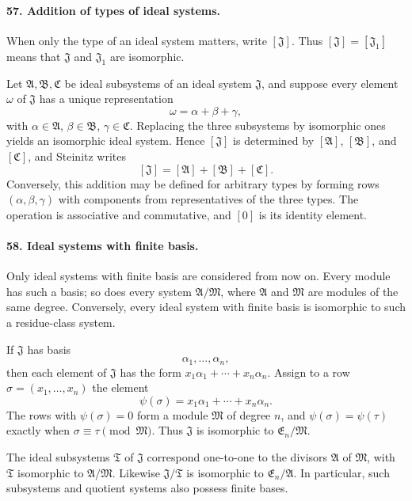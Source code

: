 \documentclass[11pt]{article}
\begin{document}
\paragraph{57. Addition of types of ideal systems.}
When only the type of an ideal system matters, write $[\mathfrak J]$. Thus $[\mathfrak J]=[\mathfrak J_1]$ means that $\mathfrak J$ and $\mathfrak J_1$ are isomorphic.

Let $\mathfrak A,\mathfrak B,\mathfrak C$ be ideal subsystems of an ideal system $\mathfrak J$, and suppose every element $\omega$ of $\mathfrak J$ has a unique representation
\begin{equation}
  \omega=\alpha+\beta+\gamma,
\tag{94}
\end{equation}
with $\alpha\in\mathfrak A$, $\beta\in\mathfrak B$, $\gamma\in\mathfrak C$. Replacing the three subsystems by isomorphic ones yields an isomorphic ideal system. Hence $[\mathfrak J]$ is determined by $[\mathfrak A]$, $[\mathfrak B]$, and $[\mathfrak C]$, and Steinitz writes
\[
  [\mathfrak J]=[\mathfrak A]+[\mathfrak B]+[\mathfrak C].
\]
Conversely, this addition may be defined for arbitrary types by forming rows $(\alpha,\beta,\gamma)$ with components from representatives of the three types. The operation is associative and commutative, and $[0]$ is its identity element.

\paragraph{58. Ideal systems with finite basis.}
Only ideal systems with finite basis are considered from now on. Every module has such a basis; so does every system $\mathfrak A/\mathfrak M$, where $\mathfrak A$ and $\mathfrak M$ are modules of the same degree. Conversely, every ideal system with finite basis is isomorphic to such a residue-class system.

If $\mathfrak J$ has basis
\begin{equation}
  \alpha_1,\ldots,\alpha_n,
\tag{95}
\end{equation}
then each element of $\mathfrak J$ has the form $x_1\alpha_1+\cdots+x_n\alpha_n$. Assign to a row $\sigma=(x_1,
\ldots,x_n)$ the element
\[
  \psi(\sigma)=x_1\alpha_1+\cdots+x_n\alpha_n.
\]
The rows with $\psi(\sigma)=0$ form a module $\mathfrak M$ of degree $n$, and $\psi(\sigma)=\psi(\tau)$ exactly when $\sigma\equiv\tau\pmod{\mathfrak M}$. Thus $\mathfrak J$ is isomorphic to $\mathfrak E_n/\mathfrak M$.

The ideal subsystems $\mathfrak T$ of $\mathfrak J$ correspond one-to-one to the divisors $\mathfrak A$ of $\mathfrak M$, with $\mathfrak T$ isomorphic to $\mathfrak A/\mathfrak M$. Likewise $\mathfrak J/\mathfrak T$ is isomorphic to $\mathfrak E_n/\mathfrak A$. In particular, such subsystems and quotient systems also possess finite bases.
\end{document}
